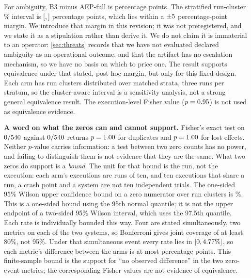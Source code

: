 For ambiguity, B3 minus AEP-full is \BthreeVsAepAmbDiffPP{} percentage points.
The stratified run-cluster \BthreeVsAepAmbDiffConfidence{}\% interval is
[\BthreeVsAepAmbDiffLow{},\,\BthreeVsAepAmbDiffHigh{}] percentage points,
which lies within a $\pm5{}$ percentage-point margin. We
introduce that margin in this revision; it was not preregistered, and we state
it as a stipulation rather than derive it. We do not claim it is immaterial to
an operator: \cref{sec:threats} records that we have not evaluated declared
ambiguity as an operational outcome, and that the artifact has no escalation
mechanism, so we have no basis on which to price one. The result
supports equivalence under that stated, post hoc margin, but only for this
fixed design. Each arm has \BthreeVsAepAmbClusters{} run clusters distributed
over \BthreeVsAepAmbStrata{} matched strata, three runs per stratum, so the
cluster-aware interval is a sensitivity analysis, not a strong general
equivalence result. The execution-level Fisher value
($p = 0.95{}$) is not used as equivalence evidence.

\textbf{A word on what the zeros can and cannot support.} Fisher's exact test
on $0{}/540{}$ against
$0{}/540{}$ returns
$p = 1.00{}$ for duplicates and $p = 1.00{}$ for lost
effects. Neither $p$-value carries information: a test between two zero
counts has no power, and failing to distinguish them is not evidence that they
are the same. What two zeros do support is a \emph{bound}. The unit for that bound
is the run, not the execution: each arm's \BthreeVsAepN{} executions are
\BthreeVsAepRuns{} runs of ten, and ten executions that share a run, a crash
point and a system are not ten independent trials. The one-sided
95\% Wilson upper confidence bound on a zero numerator over
\BthreeVsAepRuns{} run clusters is \AblationZeroUpperRun{}\%. This is a
one-sided bound using the 95th normal quantile; it is not the upper endpoint of
a two-sided 95\% Wilson interval, which uses the 97.5th quantile. Each rate is
individually bounded this way. Four are stated simultaneously, two metrics on
each of the two systems, so Bonferroni gives joint coverage of at least 80\%,
not 95\%. Under that simultaneous event every rate lies in
$[0,4.77{}\%]$, so each metric's difference between the arms
is at most \AblationZeroUpperRun{} percentage points. This finite-sample bound
is the support for ``no observed difference'' in the two zero-event metrics;
the corresponding Fisher values are not evidence of equivalence.


